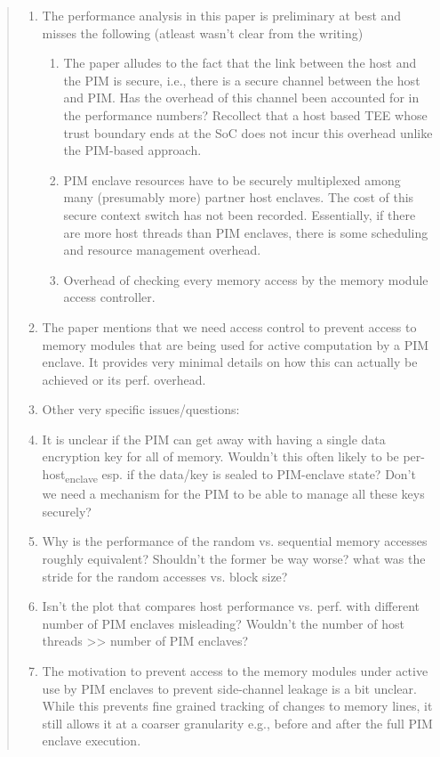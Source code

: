 \documentclass[11pt]{article}
\begin{document}
\begin{quote}
\begin{enumerate}
\item The performance analysis in this paper is preliminary at best and misses the following (atleast wasn't clear from the writing)
\begin{enumerate}
\item The paper alludes to the fact that the link between the host and the PIM is secure, i.e., there is a secure channel between the host and PIM. Has the overhead of this channel been accounted for in the performance numbers? Recollect that a host based TEE whose trust boundary ends at the SoC does not incur this overhead unlike the PIM-based approach.
\item PIM enclave resources have to be securely multiplexed among many (presumably more) partner host enclaves. The cost of this secure context switch has not been recorded. Essentially, if there are more host threads than PIM enclaves, there is some scheduling and resource management overhead.
\item Overhead of checking every memory access by the memory module access controller.
\end{enumerate}

\item The paper mentions that we need access control to prevent access to memory modules that are being used for active computation by a PIM enclave. It provides very minimal details on how this can actually be achieved or its perf. overhead.

\item Other very specific issues/questions:
\item It is unclear if the PIM can get away with having a single data encryption key for all of memory. Wouldn't this often likely to be per-host\textsubscript{enclave} esp. if the data/key is sealed to PIM-enclave state? Don't we need a mechanism for the PIM to be able to manage all these keys securely?
\item Why is the performance of the random vs. sequential memory accesses roughly equivalent? Shouldn't the former be way worse? what was the stride for the random accesses vs. block size?
\item Isn't the plot that compares host performance vs. perf. with different number of PIM enclaves misleading? Wouldn't the number of host threads >> number of PIM enclaves?
\item The motivation to prevent access to the memory modules under active use by PIM enclaves to prevent side-channel leakage is a bit unclear. While this prevents fine grained tracking of changes to memory lines, it still allows it at a coarser granularity e.g., before and after the full PIM enclave execution.
\end{enumerate}


\end{quote}
\end{document}
